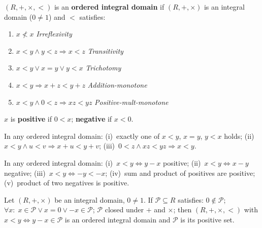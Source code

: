 \begin{tcolorbox}[colback=corbox, colframe=corborder, arc=2pt,
  left=6pt, right=6pt, top=4pt, bottom=4pt,
  title={\small\textbf{Definition 4.1 (Ordered integral domain)}},
  fonttitle=\small\bfseries]
$(R,+,\times,<)$ is an \textbf{ordered integral domain} if
$(R,+,\times)$ is an integral domain ($0\neq 1$) and $<$ satisfies:
\begin{enumerate}
  \item[(O1)] $x \not< x$ \hfill\textit{Irreflexivity}
  \item[(O2)] $x<y \wedge y<z \Rightarrow x<z$ \hfill\textit{Transitivity}
  \item[(O3)] $x<y \vee x=y \vee y<x$ \hfill\textit{Trichotomy}
  \item[(O4)] $x<y \Rightarrow x+z<y+z$ \hfill\textit{Addition-monotone}
  \item[(O5)] $x<y \wedge 0<z \Rightarrow xz<yz$ \hfill\textit{Positive-mult-monotone}
\end{enumerate}
$x$ is \textbf{positive} if $0<x$; \textbf{negative} if $x<0$.
\end{tcolorbox}

\begin{theorem}
\label{thm:men-order-axiom-consequences}
In any ordered integral domain:
(i)~exactly one of $x<y$, $x=y$, $y<x$ holds;
(ii)~$x<y \wedge u<v \Rightarrow x+u<y+v$;
(iii)~$0<z \wedge xz<yz \Rightarrow x<y$.
\end{theorem}

\begin{theorem}
\label{thm:men-order-and-positivity}
In any ordered integral domain:
(i)~$x<y \iff y-x$ positive;
(ii)~$x<y \iff x-y$ negative;
(iii)~$x<y \iff -y<-x$;
(iv)~sum and product of positives are positive;
(v)~product of two negatives is positive.
\end{theorem}

\begin{theorem}
\label{thm:men-pos-set}
Let $(R,+,\times)$ be an integral domain, $0\neq 1$.
If $\mathcal{P}\subseteq R$ satisfies:
$0\notin\mathcal{P}$;
$\forall x:\; x\in\mathcal{P} \vee x=0 \vee {-x}\in\mathcal{P}$;
$\mathcal{P}$ closed under $+$ and $\times$;
then $(R,+,\times,<)$ with $x<y \iff y-x\in\mathcal{P}$ is an
ordered integral domain and $\mathcal{P}$ is its positive set.
\end{theorem}

